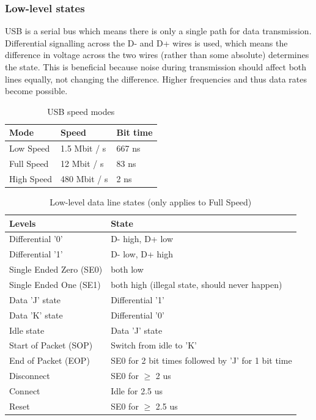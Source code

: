 \documentclass{article}
\begin{document}
\subsubsection{Low-level states}

USB is a serial bus which means there is only a single path for data transmission.
Differential signalling across the D- and D+ wires is used, which means the difference in voltage
across the two wires (rather than some absolute) determines the state. This is beneficial because
noise during transmission should affect both lines equally, not changing the difference.
Higher frequencies and thus data rates become possible.

\begin{table}[!htbp]
  \caption{USB speed modes \cite[p. 159]{usbstd}}
  \centering
  \begin{tabular}{l | l | l}
    Mode & Speed & Bit time \\ \hline
    Low Speed & 1.5 Mbit / s & 667 ns \\
    Full Speed & 12 Mbit / s & 83 ns \\
    High Speed & 480 Mbit / s & 2 ns \\
  \end{tabular}
\end{table}

\begin{table}[!htbp]
  \caption{Low-level data line states (only applies to Full Speed) \cite[p. 145]{usbstd}}
  \centering
  \begin{tabular}{l | l}
    Levels & State \\ \hline
    Differential '0' & D- high, D+ low \\
    Differential '1' & D- low, D+ high \\
    Single Ended Zero (SE0) & both low \\
    Single Ended One (SE1) & both high (illegal state, should never happen) \\
    Data 'J' state & Differential '1' \\
    Data 'K' state & Differential '0' \\
    Idle state & Data 'J' state \\
    Start of Packet (SOP) & Switch from idle to 'K' \\
    End of Packet (EOP) & SE0 for 2 bit times followed by 'J' for 1 bit time \\
    Disconnect & SE0 for $\geq$ 2 us \\
    Connect & Idle for 2.5 us \\
    Reset & SE0 for $\geq$ 2.5 us \\
  \end{tabular}
\end{table}
\end{document}
